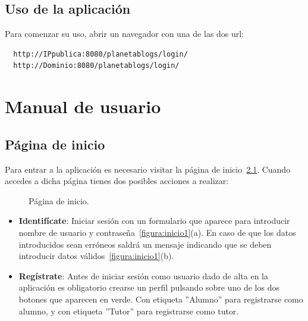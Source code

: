 \documentclass[a4paper, 12pt]{book}
\begin{document}
\section{Uso de la aplicaci\'on}
Para comenzar su uso, abrir un navegador con una de las dos url: 
  {\footnotesize\begin{verbatim} 
  http://IPpublica:8080/planetablogs/login/
  http://Dominio:8080/planetablogs/login/\end{verbatim}}

\cleardoublepage
\appendix
\chapter{Manual de usuario}
\label{app:manual}



\section{P\'agina de inicio}
Para entrar a la aplicaci\'on es necesario visitar la p\'agina de inicio~\ref{figura:inicio}. Cuando accedes a dicha p\'agina tienes dos posibles 
acciones a realizar:

\begin{figure}[htbp] 
  \centering
  \caption{P\'agina de inicio.}
  \label{figura:inicio}
\end{figure}

\begin{itemize}
  \item {\bfseries Identif\'icate}: Iniciar sesi\'on con un formulario que aparece para introducir nombre de usuario y contrase\~na~\ref{figura:inicio1}(a).
  En caso de que los datos introducidos sean err\'oneos saldr\'a un mensaje indicando que se deben introducir datos v\'alidos~\ref{figura:inicio1}(b).
  \item {\bfseries Reg\'istrate}: Antes de iniciar sesi\'on como usuario dado de alta en la aplicaci\'on es obligatorio crearse un perfil pulsando sobre 
  uno de los dos botones que aparecen en verde. Con etiqueta ''Alumno'' para registrarse como alumno, y con etiqueta ''Tutor'' para registrarse como tutor.
\end{itemize} 
\end{document}
